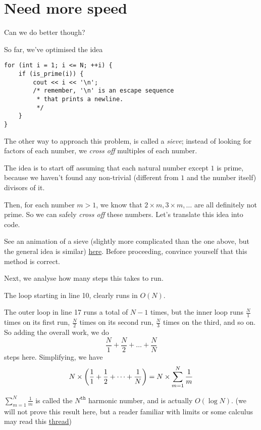\documentclass{article}
\DeclarePairedDelimiter{\braces}{(}{)}
\begin{document}
\section{Need more speed}
Can we do better though?

So far, we've optimised the idea
\begin{lstlisting}
for (int i = 1; i <= N; ++i) {
	if (is_prime(i)) {
		cout << i << '\n';
		/* remember, '\n' is an escape sequence
		 * that prints a newline.
		 */
	}
}
\end{lstlisting}

The other way to approach this problem, is called a \emph{sieve};
instead of looking for factors of each number, we \emph{cross off}
multiples of each number.

The idea is to start off assuming that each natural number except $1$ is
prime, because we haven't found any non-trivial (different from $1$ and
the number itself) divisors of it.

Then, for each number $m > 1$, we know that $2 \times m, 3\times m, \dots$
are all definitely not prime. So we can safely \emph{cross off} these numbers.
Let's translate this idea into code.



See an animation of a sieve (slightly more complicated than the one
above, but the general idea is similar) 
\href{https://en.wikipedia.org/wiki/File:Sieve_of_Eratosthenes_animation.gif}{here}.
Before proceeding, convince yourself that this method is correct.

Next, we analyse how many steps this takes to run.

The loop starting in line 10, clearly runs in $O(N)$.

The outer loop in line 17 runs a total of $N - 1$ times,
but the inner loop runs $\frac N1$ times on its first run,
$\frac N2$ times on its second run, $\frac N3$ times on 
the third, and so on.
So adding the overall work, we do
\[\frac N1 + \frac N2 + \dots + \frac NN\]
steps here.
Simplifying, we have
\[N \times \braces*{\frac 11 + \frac 12 + \dots + \frac 1N} =
N \times \sum_{m = 1}^N \frac 1m \]

$\sum_{m = 1}^N \frac 1m$ is called the $N^{\texttt{th}}$ harmonic
number, and is actually $O(\log N)$. (we will not prove this result here,
but a reader familiar with limits or some calculus may read this
\href{https://math.stackexchange.com/questions/306371/simple-proof-of-showing-the-harmonic-number-h-n-theta-log-n}
{thread})
\end{document}
